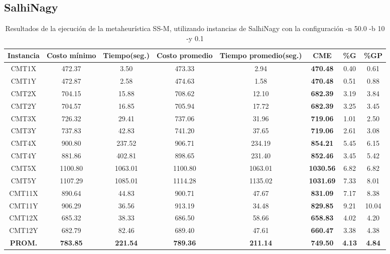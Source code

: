 \clearpage
\subsection{SalhiNagy}

\begin{table}[h]
\caption{Resultados de la ejecución de la metaheurística SS-M, utilizando instancias de SalhiNagy con la configuración -n 50.0 -b 10 -y 0.1}
\centering
\small
\begin{tabular}{c c c c c c c c}
\hline\hline
Instancia & Costo mínimo & Tiempo(seg.) & Costo promedio & Tiempo promedio(seg.) & CME & \%G & \%GP \\ [0.5ex]
\hline
CMT1X & 472.37 & 3.50 & 
473.33 & 2.94 & \bf{470.48} & 
0.40 & 0.61\\CMT1Y & 472.87 & 2.58 & 
474.63 & 1.58 & \bf{470.48} & 
0.51 & 0.88\\CMT2X & 704.15 & 15.88 & 
708.62 & 12.10 & \bf{682.39} & 
3.19 & 3.84\\CMT2Y & 704.57 & 16.85 & 
705.94 & 17.72 & \bf{682.39} & 
3.25 & 3.45\\CMT3X & 726.32 & 29.41 & 
737.06 & 31.96 & \bf{719.06} & 
1.01 & 2.50\\CMT3Y & 737.83 & 42.83 & 
741.20 & 37.65 & \bf{719.06} & 
2.61 & 3.08\\CMT4X & 900.80 & 237.52 & 
906.71 & 234.19 & \bf{854.21} & 
5.45 & 6.15\\CMT4Y & 881.86 & 402.81 & 
898.65 & 231.40 & \bf{852.46} & 
3.45 & 5.42\\CMT5X & 1100.80 & 1063.01 & 
1100.80 & 1063.01 & \bf{1030.56} & 
6.82 & 6.82\\CMT5Y & 1107.29 & 1085.01 & 
1114.28 & 1135.02 & \bf{1031.69} & 
7.33 & 8.01\\CMT11X & 890.64 & 44.83 & 
900.71 & 47.67 & \bf{831.09} & 
7.17 & 8.38\\CMT11Y & 906.29 & 36.56 & 
913.19 & 34.48 & \bf{829.85} & 
9.21 & 10.04\\CMT12X & 685.32 & 38.33 & 
686.50 & 58.66 & \bf{658.83} & 
4.02 & 4.20\\CMT12Y & 682.79 & 82.46 & 
689.40 & 47.61 & \bf{660.47} & 
3.38 & 4.38\\\bf{PROM.} & 
\bf{783.85} & \bf{221.54} & \bf{789.36} & \bf{211.14} & \bf{749.50} & \bf{4.13} & \bf{4.84}\\[1ex]\hline
\end{tabular}
\label{table:SS-M-50-0.1-S}
\end{table}


